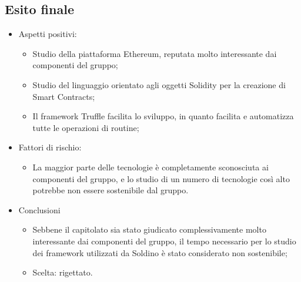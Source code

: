 \subsection{Esito finale}
    \begin{itemize}
        \item Aspetti positivi:
             \begin{itemize}
                \item Studio della piattaforma Ethereum, reputata molto interessante dai componenti del gruppo;
                \item Studio del linguaggio orientato agli oggetti Solidity per la creazione di Smart Contracts;
                \item Il framework Truffle facilita lo sviluppo, in quanto facilita e automatizza tutte le operazioni di routine;
            \end{itemize}
        \item Fattori di rischio:
            \begin{itemize}
                \item La maggior parte delle tecnologie è completamente sconosciuta ai componenti del gruppo, e lo studio di un numero di tecnologie così alto
		        potrebbe non essere sostenibile dal gruppo.
            \end{itemize}
        \item Conclusioni
            \begin{itemize}
                \item Sebbene il capitolato sia stato giudicato complessivamente molto interessante dai componenti del gruppo, il tempo necessario per lo
		        studio dei framework utilizzati da Soldino è stato considerato non sostenibile;
		        \item Scelta: rigettato.
            \end{itemize}
    \end{itemize}